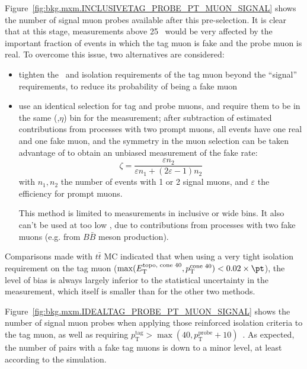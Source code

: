 Figure~\ref{fig:bkg.mxm.INCLUSIVETAG_PROBE_PT_MUON_SIGNAL} shows the number of signal muon probes available after this pre-selection. 
It is clear that at this stage, measurements above 25 \GeV~would be very affected by the important fraction of events 
in which the tag muon is fake and the probe muon is real. 
To overcome this issue, two alternatives are considered: 
\begin{itemize}
\item tighten the \pt\ and isolation requirements of the tag muon beyond the ``signal'' requirements,
to reduce its probability of being a fake muon
\item use an identical selection for tag and probe muons, and require them to be in the same (\pt,$\eta$) bin for the measurement; 
after subtraction of estimated contributions from processes with two prompt muons, all events have one real and one fake muon, 
and the symmetry in the muon selection can be taken advantage of to obtain an unbiased measurement of the fake rate: 
$$
\zeta = \frac{\varepsilon n_2}{\varepsilon n_1+(2\varepsilon-1)n_2}
$$
with $n_1, n_2$ the number of events with 1 or 2 signal muons, 
and $\varepsilon$ the efficiency for prompt muons.

This method is limited to measurements in inclusive or wide bins. 
It also can't be used at too low \pt, due to contributions from processes with two fake muons (e.g. from $B\bar B$ meson production). 
\end{itemize}
Comparisons made with $t\bar t$ MC indicated that when using a very tight isolation requirement on the tag muon 
($\operatorname{max}(E_\mathrm{T}^\text{topo, cone 40},p_\mathrm{T}^\text{cone 40})<0.02\times\pt$), 
the level of bias is always largely inferior to the statistical uncertainty in the measurement, 
which itself is smaller than for the other two methods. 

Figure~\ref{fig:bkg.mxm.IDEALTAG_PROBE_PT_MUON_SIGNAL} shows the number of signal muon probes when applying those reinforced isolation criteria to the tag muon, 
as well as requiring $p_\mathrm{T}^\text{tag}>\operatorname{max}(40,p_\mathrm{T}^\text{probe}+10)$~\GeV. 
As expected, the number of pairs with a fake tag muons is down to a minor level, at least according to the simulation. 


